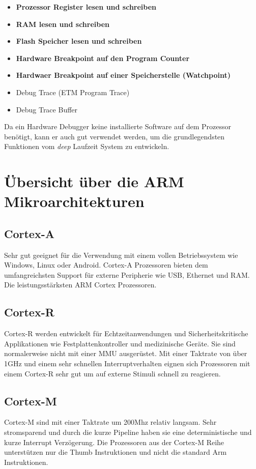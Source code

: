\begin{itemize}
	\item \textbf{Prozessor Register lesen und schreiben}
	\item \textbf{RAM lesen und schreiben}
	\item \textbf{Flash Speicher lesen und schreiben} 
	\item \textbf{Hardware Breakpoint auf den Program Counter} 
	\item \textbf{Hardwaer Breakpoint auf einer Speicherstelle (Watchpoint)} 
	\item Debug Trace (ETM Program Trace) 
	\item Debug Trace Buffer
\end{itemize}

Da ein Hardware Debugger keine installierte Software auf dem Prozessor benötigt, kann er auch gut verwendet werden, um die grundlegendsten Funktionen vom \textit{deep} Laufzeit System zu entwickeln.


\section{Übersicht über die ARM Mikroarchitekturen}
\subsection{Cortex-A}
Sehr gut geeignet für die Verwendung mit einem vollen Betriebssystem wie Windows, Linux oder Android.
Cortex-A Prozessoren bieten dem umfangreichsten Support für externe Peripherie wie USB, Ethernet und RAM.
Die leistungsstärksten ARM Cortex Prozessoren.

\subsection{Cortex-R}
Cortex-R werden entwickelt für Echtzeitanwendungen und Sicherheitskritische Applikationen wie Festplattenkontroller und medizinische Geräte.
Sie sind normalerweise nicht mit einer MMU ausgerüstet.
Mit einer Taktrate von über 1GHz und einem sehr schnellen Interruptverhalten eignen sich Prozessoren mit einem Cortex-R sehr gut um auf externe Stimuli schnell zu reagieren.

\subsection{Cortex-M}
Cortex-M sind mit einer Taktrate um 200Mhz relativ langsam.
Sehr stromsparend und durch die kurze Pipeline haben sie eine deterministische und kurze Interrupt Verzögerung.
Die Prozessoren aus der Cortex-M Reihe unterstützen nur die Thumb Instruktionen und nicht die standard Arm Instruktionen.


